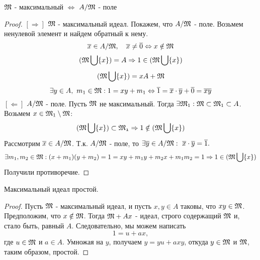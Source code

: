 \begin{thm}
$\mathfrak{M}$ - максимальный $\Leftrightarrow$ $A/\mathfrak{M}$ - поле
\end{thm}
\begin{proof}
$[\Rightarrow]$ $\mathfrak{M}$ - максимальный идеал. Покажем, что $A/\mathfrak{M}$ - поле. Возьмем ненулевой элемент и найдем обратный
к нему.
\[\overline{x} \in A/\mathfrak{M},~~~\overline{x} \neq \overline{0} \Leftrightarrow x \notin \mathfrak{M}\]
\[(\mathfrak{M}\bigcup\{x\}) = A \Rightarrow 1 \in (\mathfrak{M}\bigcup\{x\})\]
\[(\mathfrak{M}\bigcup\{x\}) = xA + \mathfrak{M}\]
\[\exists y \in A, ~ m_1 \in \mathfrak{M}: 1 = xy + m_1 \Leftrightarrow \overline{1} = \overline{x}\cdot\overline{y} + \overline{0}
 = \overline{xy}
\]
$[\Leftarrow]$ $A/\mathfrak{M}$ - поле. Пусть $\mathfrak{M}$ не максимальный. Тогда $\exists \mathfrak{M}_1: \mathfrak{M} \subset \mathfrak{M}_1
\subset A$. Возьмем $x \in \mathfrak{M}_1\setminus\mathfrak{M}$:
\[(\mathfrak{M}\bigcup\{x\}) \subset \mathfrak{M_1} \Rightarrow 1 \notin (\mathfrak{M}\bigcup\{x\})\]
Рассмотрим $\overline{x} \in A/\mathfrak{M}$. Т.к. $A/\mathfrak{M}$ - поле, то $\exists \overline{y} \in A/\mathfrak{M}:~
\overline{x}\cdot\overline{y} = \overline{1}.$
\[\exists m_1, m_2 \in \mathfrak{M}: (x + m_1)(y + m_2) = 1 = xy + m_1y + m_2x + m_1m_2 = 1 \Rightarrow 1 \in
(\mathfrak{M}\bigcup\{x\})\]
Получили противоречие.
\end{proof}

\begin{thm}
Максимальный идеал простой.
\end{thm}
\begin{proof}
Пусть $\mathfrak{M}$ - максимальный идеал, и пусть $x, y \in A$ таковы, что $xy \in \mathfrak{M}$. Предположим, что $x \notin \mathfrak{M}$.
Тогда $\mathfrak{M} + Ax$ - идеал, строго содержащий $\mathfrak{M}$ и,  стало быть, равный $A$. Следовательно, мы можем написать
\[1 = u + ax,\] где $u \in \mathfrak{M}$ и $a \in A$. Умножая на $y$, получаем $y = yu + axy$, откуда $y \in \mathfrak{M}$ и $\mathfrak{M}$,
таким образом, простой. 
\end{proof}